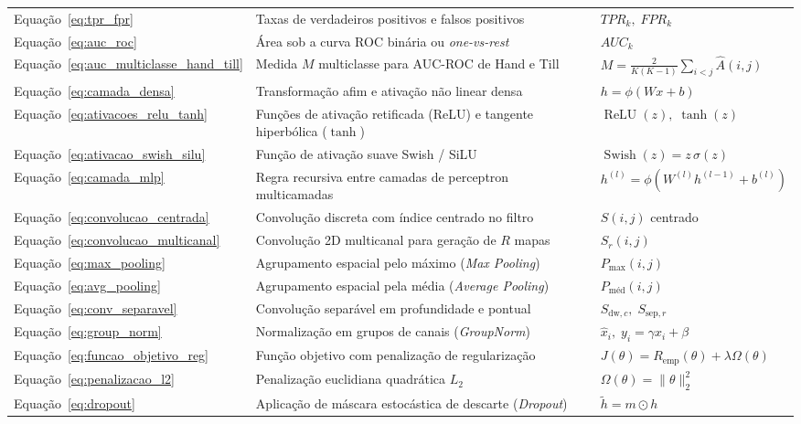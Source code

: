 \documentclass[
    12pt,
    openright,
    oneside,
    a4paper,
    english,
    brazil
]{abntex2}
\begin{document}
\begin{longtable}{@{}p{2.9cm}p{7.8cm}p{\dimexpr\textwidth-10.7cm-4\tabcolsep\relax}@{}}
Equação~\eqref{eq:tpr_fpr} & Taxas de verdadeiros positivos e falsos positivos & \(TPR_k,\; FPR_k\) \\
Equação~\eqref{eq:auc_roc} & Área sob a curva ROC binária ou \textit{one-vs-rest} & \(AUC_k\) \\
Equação~\eqref{eq:auc_multiclasse_hand_till} & Medida \(M\) multiclasse para AUC-ROC de Hand e Till & \(M = \frac{2}{K(K-1)}\sum_{i<j}\hat{A}(i,j)\) \\
Equação~\eqref{eq:camada_densa} & Transformação afim e ativação não linear densa & \(h = \phi(Wx + b)\) \\
Equação~\eqref{eq:ativacoes_relu_tanh} & Funções de ativação retificada (ReLU) e tangente hiperbólica (\(\tanh\)) & \(\operatorname{ReLU}(z),\; \tanh(z)\) \\
Equação~\eqref{eq:ativacao_swish_silu} & Função de ativação suave Swish / SiLU & \(\operatorname{Swish}(z) = z\,\sigma(z)\) \\
Equação~\eqref{eq:camada_mlp} & Regra recursiva entre camadas de perceptron multicamadas & \(h^{(l)} = \phi(W^{(l)}h^{(l-1)}+b^{(l)})\) \\
Equação~\eqref{eq:convolucao_centrada} & Convolução discreta com índice centrado no filtro & \(S(i,j)\) centrado \\
Equação~\eqref{eq:convolucao_multicanal} & Convolução 2D multicanal para geração de \(R\) mapas & \(S_r(i,j)\) \\
Equação~\eqref{eq:max_pooling} & Agrupamento espacial pelo máximo (\textit{Max Pooling}) & \(P_{\max}(i,j)\) \\
Equação~\eqref{eq:avg_pooling} & Agrupamento espacial pela média (\textit{Average Pooling}) & \(P_{\text{méd}}(i,j)\) \\
Equação~\eqref{eq:conv_separavel} & Convolução separável em profundidade e pontual & \(S_{\text{dw},c},\; S_{\text{sep},r}\) \\
Equação~\eqref{eq:group_norm} & Normalização em grupos de canais (\textit{GroupNorm}) & \(\hat{x}_i,\; y_i = \gamma\hat{x}_i+\beta\) \\
Equação~\eqref{eq:funcao_objetivo_reg} & Função objetivo com penalização de regularização & \(J(\theta) = R_{\text{emp}}(\theta) + \lambda\Omega(\theta)\) \\
Equação~\eqref{eq:penalizacao_l2} & Penalização euclidiana quadrática \(L_2\) & \(\Omega(\theta) = \|\theta\|_2^2\) \\
Equação~\eqref{eq:dropout} & Aplicação de máscara estocástica de descarte (\textit{Dropout}) & \(\tilde{h} = m \odot h\) \\

\end{longtable}
\end{document}
